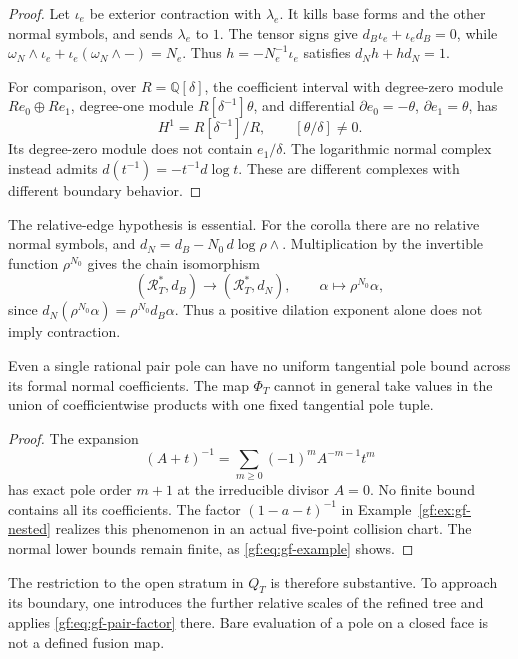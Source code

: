 \begin{proof}
Let \(\iota_e\) be exterior contraction with \(\lambda_e\).
It kills base forms and the other normal symbols, and sends
\(\lambda_e\) to \(1\).  The tensor signs give
\(d_B\iota_e+\iota_ed_B=0\), while
\(\omega_N\wedge\iota_e+\iota_e(\omega_N\wedge-) = N_e\).
Thus \(h=-N_e^{-1}\iota_e\) satisfies
\(d_Nh+hd_N=1\).

For comparison, over \(R=\mathbb Q[\delta]\), the coefficient
interval with degree-zero module \(Re_0\oplus Re_1\), degree-one
module \(R[\delta^{-1}]\theta\), and differential
\(\partial e_0=-\theta\), \(\partial e_1=\theta\), has
\[
 H^1=R[\delta^{-1}]/R,
 \qquad [\theta/\delta]\ne0.
\]
Its degree-zero module does not contain \(e_1/\delta\).
The logarithmic normal complex instead admits
\(d(t^{-1})=-t^{-1}d\log t\).
These are different complexes with different boundary behavior.
\end{proof}

The relative-edge hypothesis is essential.  For the corolla there
are no relative normal symbols, and
\(d_N=d_B-N_0\,d\log\rho\wedge\).  Multiplication by the
invertible function \(\rho^{N_0}\) gives the chain isomorphism
\[
 (\mathscr R_T^*,d_B)\longrightarrow(\mathscr R_T^*,d_N),
 \qquad \alpha\longmapsto\rho^{N_0}\alpha,
\]
since \(d_N(\rho^{N_0}\alpha)=\rho^{N_0}d_B\alpha\).
Thus a positive dilation exponent alone does not imply contraction.

\begin{proposition}
\label{gf:prop:gf-no-uniform-tangent}
Even a single rational pair pole can have no uniform tangential
pole bound across its formal normal coefficients.
The map \(\Phi_T\) cannot in general take values in the union
of coefficientwise products with one fixed tangential pole tuple.
\end{proposition}

\begin{proof}
The expansion
\[
 (A+t)^{-1}=\sum_{m\geq0}(-1)^mA^{-m-1}t^m
\]
has exact pole order \(m+1\) at the irreducible divisor \(A=0\).
No finite bound contains all its coefficients.
The factor \((1-a-t)^{-1}\) in
Example~\ref{gf:ex:gf-nested} realizes this phenomenon in an actual
five-point collision chart.  The normal lower bounds remain finite,
as \eqref{gf:eq:gf-example} shows.
\end{proof}

The restriction to the open stratum in \(Q_T\) is therefore
substantive.  To approach its boundary, one introduces the further
relative scales of the refined tree and applies
\eqref{gf:eq:gf-pair-factor} there.  Bare evaluation of a pole on
a closed face is not a defined fusion map.

